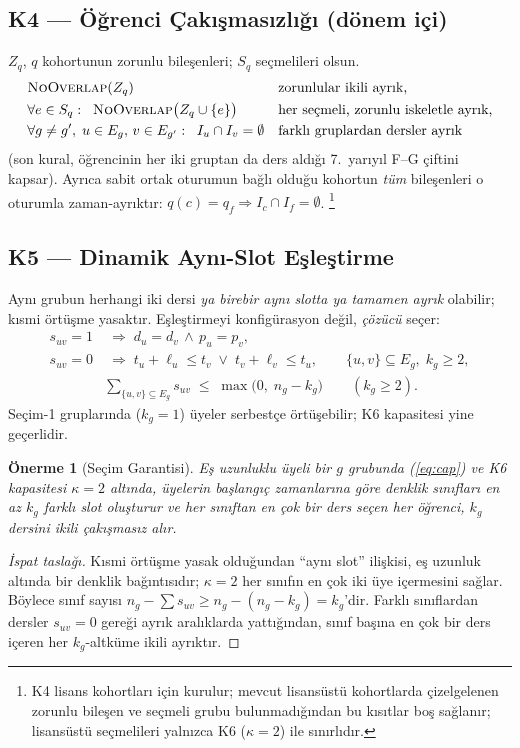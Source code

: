 \documentclass[11pt,a4paper]{article}
\newtheorem{proposition}{Önerme}
\theoremstyle{definition}
\begin{document}
\subsection*{K4 --- Öğrenci Çakışmasızlığı (dönem içi)}
$Z_q$, $q$ kohortunun zorunlu bileşenleri; $S_q$ seçmelileri olsun.
\begin{align}
&\textsc{NoOverlap}(Z_q) && \text{zorunlular ikili ayrık,}\\
&\forall e\in S_q:\;\; \textsc{NoOverlap}\bigl(Z_q\cup\{e\}\bigr)
  && \text{her seçmeli, zorunlu iskeletle ayrık,}\\
&\forall g\ne g' ,\; u\in E_g,\, v\in E_{g'}:\;\; I_u\cap I_v=\emptyset
  && \text{farklı gruplardan dersler ayrık}
\end{align}
(son kural, öğrencinin her iki gruptan da ders aldığı 7.~yarıyıl F--G çiftini
kapsar). Ayrıca sabit ortak oturumun bağlı olduğu kohortun \emph{tüm} bileşenleri
o oturumla zaman-ayrıktır: $q(c)=q_f \Rightarrow I_c\cap I_f=\emptyset$.%
\footnote{K4 lisans kohortları için kurulur; mevcut lisansüstü kohortlarda
çizelgelenen zorunlu bileşen ve seçmeli grubu bulunmadığından bu kısıtlar boş
sağlanır; lisansüstü seçmelileri yalnızca K6 ($\kappa=2$) ile sınırlıdır.}

\subsection*{K5 --- Dinamik Aynı-Slot Eşleştirme}
Aynı grubun herhangi iki dersi \emph{ya birebir aynı slotta ya tamamen ayrık}
olabilir; kısmi örtüşme yasaktır. Eşleştirmeyi konfigürasyon değil,
\emph{çözücü} seçer:
\begin{align}
s_{uv}=1 &\;\Longrightarrow\; d_u=d_v \,\wedge\, p_u=p_v, \\
s_{uv}=0 &\;\Longrightarrow\; t_u+\ell_u\le t_v \;\vee\; t_v+\ell_v\le t_u,
\qquad \{u,v\}\subseteq E_g,\; k_g\ge 2,\\
&\sum_{\{u,v\}\subseteq E_g} s_{uv} \;\le\; \max\bigl(0,\; n_g-k_g\bigr)
\qquad (k_g \ge 2). \label{eq:cap}
\end{align}
Seçim-1 gruplarında ($k_g=1$) üyeler serbestçe örtüşebilir; K6 kapasitesi yine
geçerlidir.

\begin{proposition}[Seçim Garantisi]\label{prop:selection}
Eş uzunluklu üyeli bir $g$ grubunda \textup{(\ref{eq:cap})} ve K6 kapasitesi
$\kappa=2$ altında, üyelerin başlangıç zamanlarına göre denklik sınıfları en az
$k_g$ farklı slot oluşturur ve her sınıftan en çok bir ders seçen \emph{her}
öğrenci, $k_g$ dersini ikili çakışmasız alır.
\end{proposition}
\begin{proof}[İspat taslağı]
Kısmi örtüşme yasak olduğundan ``aynı slot'' ilişkisi, eş uzunluk altında bir
denklik bağıntısıdır; $\kappa=2$ her sınıfın en çok iki üye içermesini sağlar.
Böylece sınıf sayısı $n_g-\sum s_{uv}\ge n_g-(n_g-k_g)=k_g$'dir. Farklı
sınıflardan dersler $s_{uv}=0$ gereği ayrık aralıklarda yattığından, sınıf
başına en çok bir ders içeren her $k_g$-altküme ikili ayrıktır. \qedhere
\end{proof}
\end{document}

